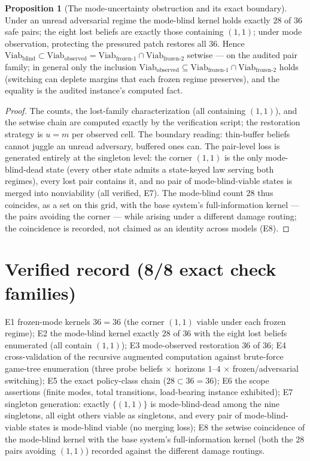 \documentclass[10pt,twocolumn]{article}
\theoremstyle{definition}
\newtheorem{proposition}{Proposition}
\begin{document}
\begin{proposition}[The mode-uncertainty obstruction and its exact boundary]
\label{prop:hybrid}
Under an unread adversarial regime the mode-blind kernel holds exactly
$28$ of $36$ safe pairs; the eight lost beliefs are exactly those
containing $(1,1)$; under mode observation, protecting the pressured
patch restores all $36$. Hence
$\mathrm{Viab}_{\text{blind}}\subset
\mathrm{Viab}_{\text{observed}}=\mathrm{Viab}_{\text{frozen-}1}\cap
\mathrm{Viab}_{\text{frozen-}2}$ setwise --- on the audited pair family;
in general only the inclusion
$\mathrm{Viab}_{\text{observed}}\subseteq
\mathrm{Viab}_{\text{frozen-}1}\cap
\mathrm{Viab}_{\text{frozen-}2}$ holds (switching can deplete margins
that each frozen regime preserves), and the equality is the audited
instance's computed fact.
\end{proposition}
\begin{proof}
The counts, the lost-family characterization (all containing $(1,1)$),
and the setwise chain are computed exactly by the verification script; the
restoration strategy is $u=m$ per observed cell. The boundary reading:
thin-buffer beliefs cannot juggle an unread adversary, buffered ones can.
The pair-level loss is generated entirely at the singleton level: the
corner $(1,1)$ is the only mode-blind-dead state (every other state admits
a state-keyed law serving both regimes), every lost pair contains it, and
no pair of mode-blind-viable states is merged into nonviability (all
verified, E7). The mode-blind count $28$ thus coincides, as a set on this
grid, with the base system's full-information kernel --- the pairs
avoiding the corner --- while arising under a different damage routing;
the coincidence is recorded, not claimed as an identity across models
(E8).
\end{proof}

\section{Verified record (8/8 exact check families)}

E1 frozen-mode kernels $36=36$ (the corner $(1,1)$ viable under each
frozen regime); E2 the mode-blind kernel exactly $28$ of $36$ with the
eight lost beliefs enumerated (all contain $(1,1)$); E3 mode-observed
restoration $36$ of $36$; E4 cross-validation of the recursive augmented
computation against brute-force game-tree enumeration (three probe
beliefs $\times$ horizons $1$--$4$ $\times$ frozen/adversarial
switching); E5 the exact policy-class chain ($28\subset36=36$); E6 the
scope assertions (finite modes, total transitions, load-bearing instance
exhibited); E7 singleton generation: exactly $\{(1,1)\}$ is
mode-blind-dead among the nine singletons, all eight others viable as
singletons, and every pair of mode-blind-viable states is mode-blind
viable (no merging loss); E8 the setwise coincidence of the mode-blind
kernel with the base system's full-information kernel (both the $28$ pairs
avoiding $(1,1)$) recorded against the different damage routings.
\end{document}

